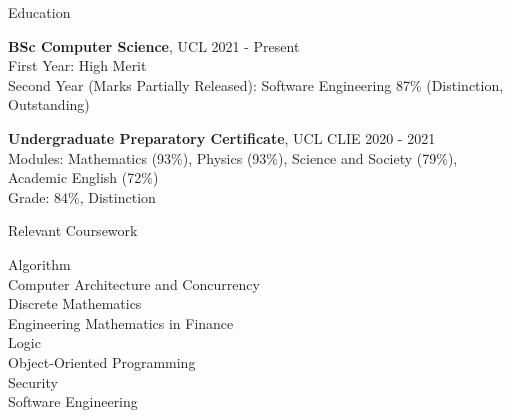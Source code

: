 \documentclass{resume} %
\begin{document}

\begin{rSection}{Education}

{\bf BSc Computer Science}, UCL \hfill {2021 - Present}\\
First Year: High Merit \\
Second Year (Marks Partially Released): Software Engineering 87\% (Distinction, Outstanding)

{\bf Undergraduate Preparatory Certificate}, UCL CLIE \hfill {2020 - 2021}\\
Modules: Mathematics (93\%), Physics (93\%), Science and Society (79\%), Academic English (72\%)\\
Grade: 84\%, Distinction


\end{rSection}
\begin{rSection}{Relevant Coursework}
\begin{multicols}{2}
Algorithm \\
Computer Architecture and Concurrency \\
Discrete Mathematics \\
Engineering Mathematics in Finance \\
Logic \\
Object-Oriented Programming \\
Security \\ 
Software Engineering
\end{multicols}
\end{rSection}
\end{document}
